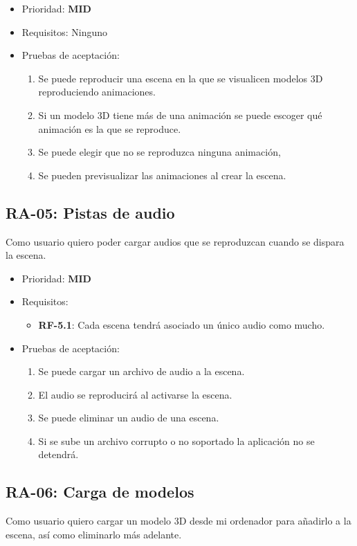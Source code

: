 \begin{itemize}
    \item Prioridad: \textbf{MID}
    \item Requisitos: Ninguno
    \item Pruebas de aceptación:
	\begin{enumerate}
		\item Se puede reproducir una escena en la que se visualicen modelos 3D reproduciendo animaciones.
		\item Si un modelo 3D tiene más de una animación se puede escoger qué animación es la que se reproduce.
		\item Se puede elegir que no se reproduzca ninguna animación,
		\item Se pueden previsualizar las animaciones al crear la escena.
	\end{enumerate}
\end{itemize}

\subsection{RA-05: Pistas de audio}
Como usuario quiero poder cargar audios que se reproduzcan cuando se dispara la escena.

\begin{itemize}
    \item Prioridad: \textbf{MID}
    \item Requisitos:
            \begin{itemize}
                \item \textbf{RF-5.1}: Cada escena tendrá asociado un único audio como mucho.
            \end{itemize}
	\item Pruebas de aceptación:
	\begin{enumerate}
		\item Se puede cargar un archivo de audio a la escena.
		\item El audio se reproducirá al activarse la escena.
		\item Se puede eliminar un audio de una escena.
		\item Si se sube un archivo corrupto o no soportado la aplicación no se detendrá.
	\end{enumerate}
\end{itemize}

\subsection{RA-06: Carga de modelos}
Como usuario quiero cargar un modelo 3D desde mi ordenador para añadirlo a la escena, así como eliminarlo más adelante.

